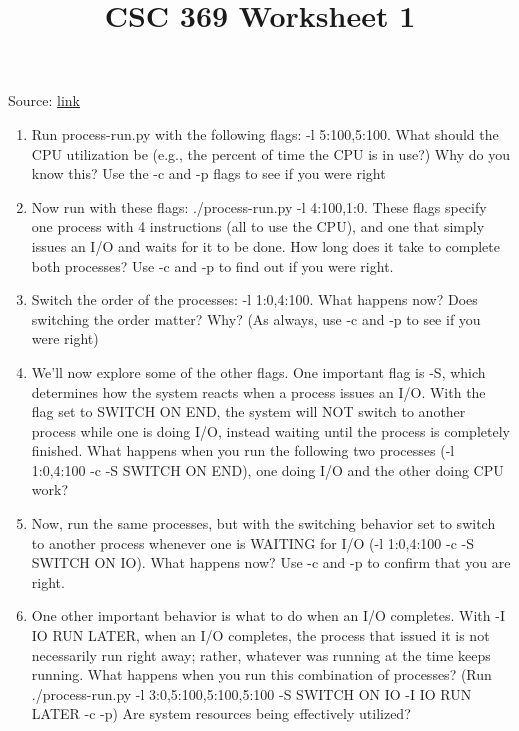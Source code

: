 \documentclass[12pt]{article}
\begin{document}
\title{CSC 369 Worksheet 1}
\maketitle

\bigskip

Source: \href{http://pages.cs.wisc.edu/~remzi/OSTEP/cpu-intro.pdf}{link}

\bigskip

\begin{enumerate}[1.]
    \item Run process-run.py with the following flags: -l 5:100,5:100.
    What should the CPU utilization be (e.g., the percent of time the
    CPU is in use?) Why do you know this? Use the -c and -p flags to
    see if you were right

    \item  Now run with these flags: ./process-run.py -l 4:100,1:0.
    These flags specify one process with 4 instructions (all to use the
    CPU), and one that simply issues an I/O and waits for it to be done.
    How long does it take to complete both processes? Use -c and -p
    to find out if you were right.

    \item Switch the order of the processes: -l 1:0,4:100. What happens
    now? Does switching the order matter? Why? (As always, use -c
    and -p to see if you were right)

    \item We’ll now explore some of the other flags. One important flag is
    -S, which determines how the system reacts when a process issues an I/O. With the flag set to SWITCH ON END, the system
    will NOT switch to another process while one is doing I/O, instead waiting until the process is completely finished. What happens when you run the following two processes (-l 1:0,4:100
    -c -S SWITCH ON END), one doing I/O and the other doing CPU
    work?

    \item Now, run the same processes, but with the switching behavior set
    to switch to another process whenever one is WAITING for I/O (-l
    1:0,4:100 -c -S SWITCH ON IO). What happens now? Use -c
    and -p to confirm that you are right.

    \item  One other important behavior is what to do when an I/O completes. With -I IO RUN LATER, when an I/O completes, the process that issued it is not necessarily run right away; rather, whatever
    was running at the time keeps running. What happens when you
    run this combination of processes? (Run ./process-run.py -l
    3:0,5:100,5:100,5:100 -S SWITCH ON IO -I IO RUN LATER
    -c -p) Are system resources being effectively utilized?


\end{enumerate}
\end{document}
